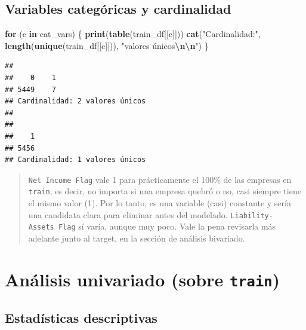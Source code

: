 \documentclass[
]{book}
\newenvironment{Shaded}{\begin{snugshade}}{\end{snugshade}}
\newcommand{\ControlFlowTok}[1]{\textcolor[rgb]{0.13,0.29,0.53}{\textbf{#1}}}
\newcommand{\FunctionTok}[1]{\textcolor[rgb]{0.13,0.29,0.53}{\textbf{#1}}}
\newcommand{\NormalTok}[1]{#1}
\newcommand{\SpecialCharTok}[1]{\textcolor[rgb]{0.81,0.36,0.00}{\textbf{#1}}}
\newcommand{\StringTok}[1]{\textcolor[rgb]{0.31,0.60,0.02}{#1}}
\begin{document}
\section{Variables categóricas y cardinalidad}\label{variables-categuxf3ricas-y-cardinalidad}

\begin{Shaded}
\begin{Highlighting}[]
\ControlFlowTok{for}\NormalTok{ (c }\ControlFlowTok{in}\NormalTok{ cat\_vars) \{}
  \FunctionTok{print}\NormalTok{(}\FunctionTok{table}\NormalTok{(train\_df[[c]]))}
  \FunctionTok{cat}\NormalTok{(}\StringTok{"Cardinalidad:"}\NormalTok{, }\FunctionTok{length}\NormalTok{(}\FunctionTok{unique}\NormalTok{(train\_df[[c]])), }\StringTok{"valores únicos}\SpecialCharTok{\textbackslash{}n\textbackslash{}n}\StringTok{"}\NormalTok{)}
\NormalTok{\}}
\end{Highlighting}
\end{Shaded}

\begin{verbatim}
## 
##    0    1 
## 5449    7 
## Cardinalidad: 2 valores únicos
## 
## 
##    1 
## 5456 
## Cardinalidad: 1 valores únicos
\end{verbatim}

\begin{quote}
\texttt{Net\ Income\ Flag} vale 1 para prácticamente el 100\% de las empresas en \texttt{train}, es
decir, no importa si una empresa quebró o no, casi siempre tiene el mismo valor (1).
Por lo tanto, es una variable (casi) constante y sería una candidata clara para
eliminar antes del modelado. \texttt{Liability-Assets\ Flag} sí varía, aunque muy poco. Vale
la pena revisarla más adelante junto al target, en la sección de análisis bivariado.
\end{quote}

\chapter{\texorpdfstring{Análisis univariado (sobre \texttt{train})}{Análisis univariado (sobre train)}}\label{anuxe1lisis-univariado-sobre-train}

\section{Estadísticas descriptivas}\label{estaduxedsticas-descriptivas}
\end{document}
